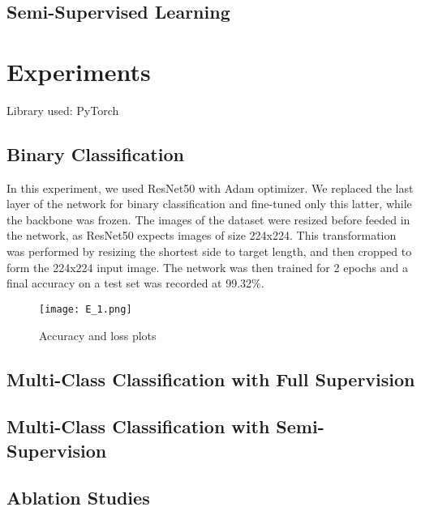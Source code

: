 \documentclass{article}
\begin{document}
\subsection{Semi-Supervised Learning}


\section{Experiments}
Library used: PyTorch


\subsection{Binary Classification}
In this experiment, we used ResNet50 with Adam optimizer. We replaced the last layer of the network for binary classification and fine-tuned only this latter, while the backbone was frozen. The images of the dataset were resized before feeded in the network, as ResNet50 expects images of size 224x224. This transformation was performed by resizing the shortest side to target length, and then cropped to form the 224x224 input image. The network was then trained for 2 epochs and a final accuracy on a test set was recorded at 99.32\%. 

\begin{figure}[h]
    \centering
    \texttt{[image: E\_1.png]}
    \caption{Accuracy and loss plots}
\end{figure}


\subsection{Multi-Class Classification with Full Supervision}


\subsection{Multi-Class Classification with Semi-Supervision}


\subsection{Ablation Studies}
\end{document}
